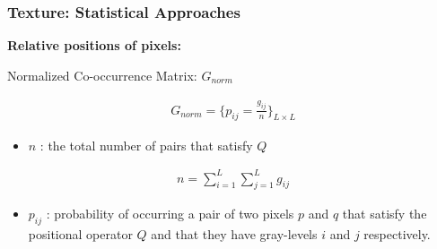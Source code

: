 \documentclass[english,11pt,table,handout]{beamer}
\begin{document}
\frame
{
	\frametitle{Texture: Statistical Approaches}
	\large
	\textbf{Relative positions of pixels: }
	\newline
	
	\begin{alertblock}{Normalized Co-occurrence Matrix: $G_{norm}$}
	
		\begin{equation}
		\begin{split}
		\nonumber
			G_{norm} = \{p_{ij} = \frac{g_{ij}}{n} \}_{L \times L}
		\end{split}
		\end{equation}
		\begin{itemize}
			\item $n$ : the total number of pairs that satisfy $Q$
		\end{itemize}
		\begin{equation}
			\begin{split}
			\nonumber
				n = \sum_{i=1}^{L}{ \sum_{j=1}^{L} {g_{ij}} }
			\end{split}
		\end{equation}
		\begin{itemize}
			\item $p_{ij}$ : probability of occurring a pair of two pixels $p$ and $q$ that satisfy the positional operator $Q$ and that they have gray-levels $i$ and $j$ respectively.
		\end{itemize}
	\end{alertblock}
}
\end{document}

